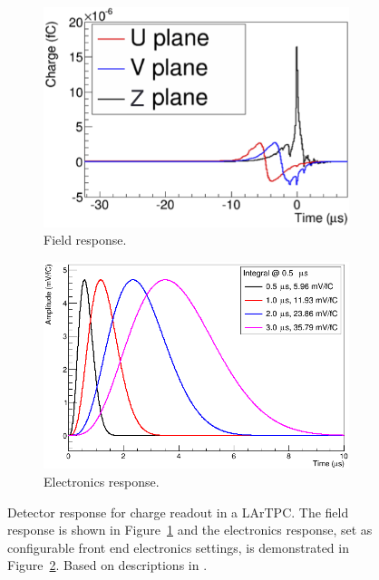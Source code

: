 \begin{figure}
  \centering
  \begin{subfigure}[t]{0.48\linewidth}
    \centering
    \includegraphics[width=0.98\textwidth]{FieldResponse.png}
    \caption{Field response.}
    \label{fig:FieldResponse}
  \end{subfigure}
  \hfill
  \begin{subfigure}[t]{0.48\linewidth}
    \centering
    \includegraphics[width=0.98\textwidth]{ElectronicsResponse.png}
    \caption{Electronics response.}
    \label{fig:ElectronicsResponse}
  \end{subfigure}
  \caption[Detector response for charge readout in a LArTPC.]{Detector response for charge readout in a LArTPC.  The field response is shown in Figure~\ref{fig:FieldResponse} and the electronics response, set as configurable front end electronics settings, is demonstrated in Figure~\ref{fig:ElectronicsResponse}.  Based on descriptions in \cite{MicroBooNERawCharge2016}.}
  \label{fig:DetectorResponse}
\end{figure}

